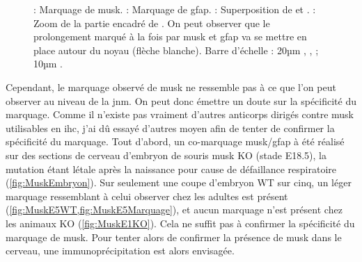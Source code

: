 \begin{figure}[h]
{			 : Marquage de \gls{musk}.
			 : Marquage de \gls{gfap}.
			 : Superposition de  et .
			 : Zoom de la partie encadré de . On peut observer que le prolongement marqué à la fois par \gls{musk} et \gls{gfap} va se mettre en place autour du noyau (flèche blanche).
			Barre d'échelle : 20µm , ,  ; 10µm .
				}	
		\label{fig:colocalisation}
	\end{figure}
\FloatBarrier
	
	Cependant, le marquage observé de \gls{musk} ne ressemble pas à ce que l'on peut observer au niveau de la \gls{jnm}.  On peut donc émettre un doute sur la spécificité du marquage. Comme il n'existe pas vraiment d'autres anticorps dirigés contre \gls{musk} utilisables en \gls{ihc}, j'ai dû essayé d'autres moyen afin de tenter de confirmer la spécificité du marquage. Tout d'abord, un co-marquage \gls{musk}/\acrshort{gfap} à été réalisé sur des sections de cerveau d'embryon de souris \gls{musk} KO (stade E18.5), la mutation étant létale après la naissance pour cause de défaillance respiratoire (\cref{fig:MuskEmbryon}). Sur seulement une coupe d'embryon WT sur cinq, un léger marquage ressemblant à celui observer chez les adultes est présent (\cref{fig:MuskE5WT,fig:MuskE5Marquage}), et aucun marquage n'est présent chez les animaux KO (\cref{fig:MuskE1KO}). Cela ne suffit pas à confirmer la spécificité du marquage de \gls{musk}. Pour tenter alors de confirmer la présence de \gls{musk} dans le cerveau, une immunoprécipitation est alors envisagée.
	
